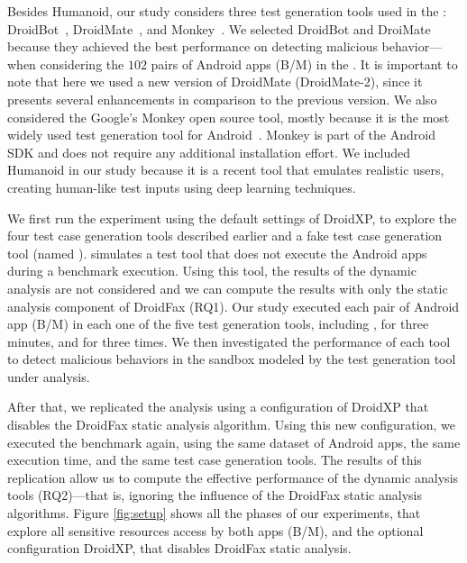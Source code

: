 Besides Humanoid, our study considers three test generation tools used in the \blls: DroidBot~\cite{DBLP:conf/icse/LiYGC17},
DroidMate~\cite{DBLP:conf/icse/JamrozikZ16}, and Monkey~\cite{Monkey}. We selected DroidBot and DroiMate because they achieved
the best performance on detecting malicious behavior---when considering the $102$ pairs of Android apps (B/M) in the \blls.
It is important to note that here we used a new version of DroidMate (DroidMate-2), since it presents several enhancements
in comparison to the previous version. We also considered the Google's Monkey open source tool, mostly because it is the most
widely used test generation tool for Android~\cite{DBLP:conf/sigsoft/ZengLZXDLYX16}. Monkey is part of the Android SDK
and does not require any additional installation effort. We included Humanoid in our study
because it is a recent tool that emulates realistic users, creating human-like test inputs using deep learning techniques.




We first run the experiment using the default
settings of DroidXP, to explore the four test case generation tools described earlier and a fake test
case generation tool (named \joke). \joke simulates a test tool that does not execute
the Android apps during a benchmark execution. Using this tool, the results
of the dynamic analysis are not considered and we can compute the results with
only the static analysis component of DroidFax (RQ1). Our study executed each pair of
Android app (B/M) in each one of the five test generation tools, including \joke,
for three minutes, and for three times. We then investigated the performance of each tool to detect malicious behaviors in the sandbox
modeled by the test generation tool
under analysis. 


After that, we replicated the analysis using a configuration of DroidXP that disables the DroidFax static analysis algorithm.
Using this new configuration, we executed the benchmark again, using the same dataset of Android apps, the same execution time,
and the same test case generation tools.
The results of this replication allow us to compute the effective performance
of the dynamic analysis tools (RQ2)---that is, ignoring the influence of the
DroidFax static analysis algorithms.
Figure \ref{fig:setup} shows all the phases of our experiments, that explore all sensitive
resources access by both apps (B/M), and the optional configuration DroidXP, that disables DroidFax static analysis.


